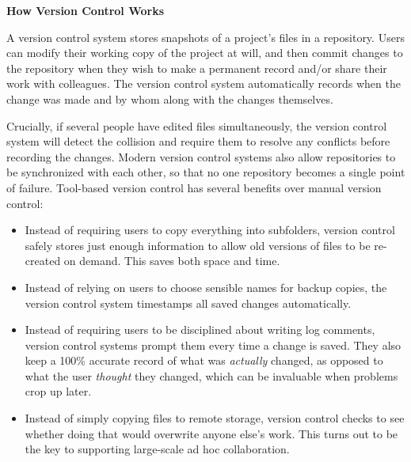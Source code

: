 \documentclass[10pt]{article}
\begin{document}
\begin{framed}
  \noindent \textbf{How Version Control Works}

  A version control system stores snapshots of a project's files in a
  repository. Users can modify their working copy of the project at
  will, and then commit changes to the repository when they wish to
  make a permanent record and/or share their work with colleagues. The
  version control system automatically records when the change was
  made and by whom along with the changes themselves.
  
  Crucially, if several people have edited files simultaneously, the
  version control system will detect the collision and require them to
  resolve any conflicts before recording the changes. Modern version
  control systems also allow repositories to be synchronized with each
  other, so that no one repository becomes a single point of failure.
  Tool-based version control has several benefits over manual version
  control:

  \begin{itemize}

  \item
    Instead of requiring users to copy everything into subfolders,
    version control safely stores just enough information to allow old
    versions of files to be re-created on demand. This saves both
    space and time.

  \item
    Instead of relying on users to choose sensible names for backup
    copies, the version control system timestamps all saved changes
    automatically.

  \item
    Instead of requiring users to be disciplined about writing log
    comments, version control systems prompt them every time a change
    is saved. They also keep a 100\% accurate record of what was
    \emph{actually} changed, as opposed to what the user
    \emph{thought} they changed, which can be invaluable when problems
    crop up later.

  \item
    Instead of simply copying files to remote storage, version control
    checks to see whether doing that would overwrite anyone else's
    work.  This turns out to be the key to supporting large-scale ad
    hoc collaboration.

  \end{itemize}
\end{framed}
\end{document}
